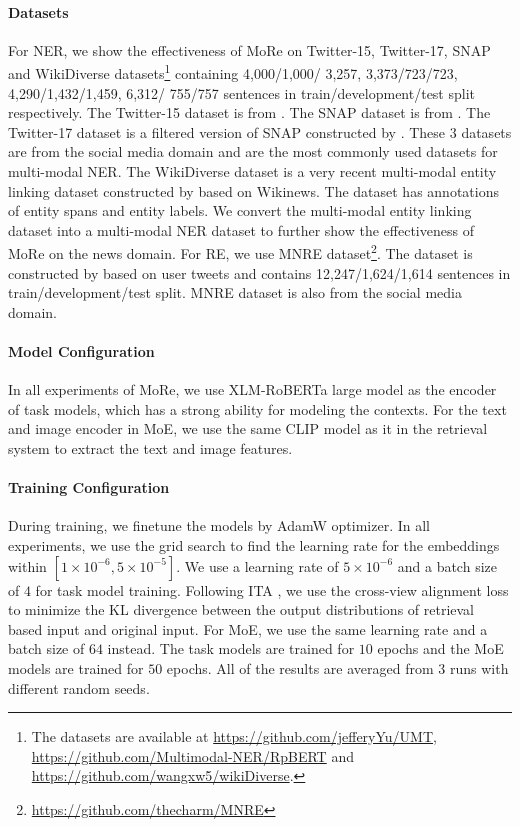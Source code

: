 \documentclass[11pt]{article}
\begin{document}
\paragraph{Datasets}
For NER, we show the effectiveness of MoRe on Twitter-15, Twitter-17, SNAP and WikiDiverse datasets\footnote{The datasets are available at
\url{https://github.com/jefferyYu/UMT}, \url{https://github.com/Multimodal-NER/RpBERT} and \url{https://github.com/wangxw5/wikiDiverse}.} containing 4,000/1,000/ 3,257, 3,373/723/723, 4,290/1,432/1,459, 6,312/ 755/757 sentences in train/development/test split respectively. The Twitter-15 dataset is from \citet{zhang2018adaptive}. The SNAP dataset is from \citet{lu-etal-2018-visual}. The Twitter-17 dataset is a filtered version of SNAP constructed by \citet{yu-etal-2020-improving-multimodal}. These $3$ datasets are from the social media domain and are the most commonly used datasets for multi-modal NER. The WikiDiverse dataset is a very recent multi-modal entity linking dataset constructed by \citet{wang2022wikidiverse} based on Wikinews. The dataset has annotations of entity spans and entity labels. We convert the multi-modal entity linking dataset into a multi-modal NER dataset to further show the effectiveness of MoRe on the news domain. For RE, we use MNRE dataset\footnote{\url{https://github.com/thecharm/MNRE}}. The dataset is constructed by \citet{zheng2021mnre} based on user tweets and contains 12,247/1,624/1,614 sentences in train/development/test split. MNRE dataset is also from the social media domain.

\paragraph{Model Configuration}
In all experiments of MoRe, we use XLM-RoBERTa large \citep[XLMR;][]{conneau-etal-2020-unsupervised} model as the encoder of task models, which has a strong ability for modeling the contexts. For the text and image encoder in MoE, we use the same CLIP model as it in the retrieval system to extract the text and image features.


\paragraph{Training Configuration}
During training, we finetune the models by AdamW \citep{loshchilov2018decoupled} optimizer. In all experiments, we use the grid search to find the learning rate for the embeddings within $[1\times 10^{-6}, 5\times 10^{-5}]$. We use a learning rate of $5\times 10^{-6}$ and a batch size of $4$ for task model training. Following ITA \citep{wang2022ita}, we use the cross-view alignment loss to minimize the KL divergence between the output distributions of retrieval based input and original input. For MoE, we use the same learning rate and a batch size of $64$ instead. The task models are trained for $10$ epochs and the MoE models are trained for $50$ epochs. All of the results are averaged from $3$ runs with different random seeds.
\end{document}
